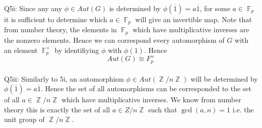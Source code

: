 \documentclass[letterpaper]{article}
\DeclareMathOperator{\F}{\mathbb{F}}
\DeclareMathOperator{\Z}{\mathbb{Z}}
\newcommand{\ol}{\overline}
\begin{document}
 
\noindent Q5i: Since any any $\phi \in Aut(G)$ is determined by $\phi(\ol{1}) = a \ol{1}$, for some $a\in \F_p$ it is sufficient to determine which $a\in \F_p$ will give an invertible map. Note that from number theory, the elements in $\F_p$ which have multiplicative inverses are the nonzero elements. Hence we can correspond every automorphism of $G$ with an element $\F_p^\times$ by identifiying $\phi$ with $\phi(1)$. Hence $$Aut(G) \cong F_p^\times $$
\newline \\ Q5ii: Similarly to 5i, an automorphism $\phi \in Aut(\Z / n \Z)$ will be determined by $\phi(\ol{1})= a \ol{1}. $ Hence the set of all automorphisms can be corresponded to the set of all $a\in \Z / n\Z $ which have multiplicative inverses. We know from number theory this is exactly the set of all $a\in Z / n\Z$ such that $\gcd(a,n)=1$ i.e. the unit group of $\Z / n\Z$. 
\end{document}
